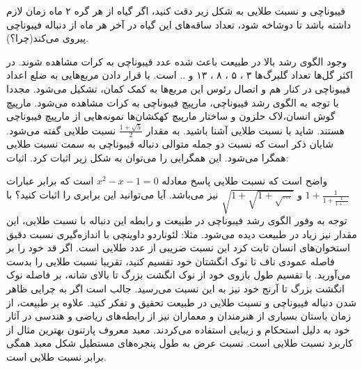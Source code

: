 \begin{EXTRA}{فیبوناچی و نسبت طلایی }
    \p
    به شکل زیر دقت کنید، اگر گیاه از هر گره ۲ ماه زمان لازم داشته باشد تا دوشاخه شود، تعداد ساقه‌های این گیاه در آخر هر ماه از دنباله فیبوناچی پیروی می‌کند(چرا؟).
    
    \p
    وجود الگوی رشد بالا در طبیعت باعث شده عدد فیبوناچی به کرات مشاهده شوند.
    در اکثر گل‌ها تعداد گلبرگ‌ها ۳ ، ۵ ، ۸ ، ۱۳ و .. است.
    \p
    با قرار دادن مربع‌هایی به ضلع اعداد فیبوناچی در کنار هم و اتصال رئوس این مربع‌ها به کمک کمان، تشکیل می‌شود.
    \p
    مجددا با توجه به الگوی رشد فیبوناچی، مارپیچ فیبوناچی به کرات مشاهده می‌شود.
    مارپیچ گوش انسان،لاک حلزون و ساختار مارپیچ کهکشان‌ها نمونه‌هایی از مارپیچ فیبوناچی هستند.
    \p
    شاید با نسبت طلایی آشنا باشید. به مقدار $\frac{1+\sqrt{5}}{2}$ نسبت طلایی گفته می‌شود.
    شایان ذکر است که نسبت دو جمله متوالی دنباله فیبوناچی به سمت نسبت طلایی همگرا می‌شود.
    این همگرایی را می‌توان به شکل زیر اثبات کرد.
    اثبات:

    \p
    واضح است که نسبت طلایی پاسخ معادله
    $x^2-x-1=0$
    است که برابر عبارات
    $1+\frac{1}{1+\frac{1}{1+...}}$
    و
    $\sqrt{1+\sqrt{1+\sqrt{...}}}$
    نیز می‌باشد.
    آیا می‌توانید این برابری را اثبات کنید؟
    \p
    با توجه به وفور الگوی رشد فیبوناچی در طبیعت و رابطه این دنباله با نسبت طلایی، این مقدار نیز زیاد در طبیعت دیده می‌شود.
    مثلا:
    لئوناردو داوینچی با اندازه‌گیری نسبت دقیق استخوان‌های انسان ثابت کرد این نسبت ضریبی از عدد طلایی است.
    اگر قد خود را بر فاصله عمودی ناف تا نوک انگشتان خود تقسیم کنید، تقریبا نسبت طلایی را بدست می‌آورید.
    با تقسیم طول بازوی خود از نوک انگشت بزرگ تا بالای شانه، بر فاصله نوک انگشت بزرگ تا آرنج خود نیز به این نسبت می‌رسید.
    جالب است اگر به چرایی ظاهر شدن دنباله فیبوناچی و نسبت طلایی در طبیعت تحقیق و تفکر کنید.
    \p
    علاوه بر طبیعت، از زمان باستان بسیاری از هنرمندان و معماران نیز از رابطه‌های ریاضی و هندسی در آثار خود به دلیل استحکام و زیبایی استفاده می‌کردند.
    معبد معروف پارتنون بهترین مثال از کاربرد نسبت طلایی است. نسبت عرض به طول پنجره‌های مستطیل شکل معبد همگی برابر نسبت طلایی است.

\end{EXTRA}